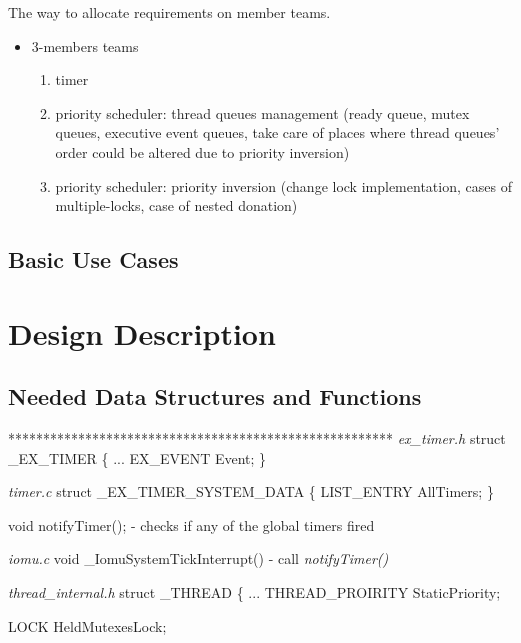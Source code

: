 The way to allocate requirements on member teams. 
\begin{itemize}
    \item 3-members teams
        \begin{enumerate}
            \item timer
            
            \item priority scheduler: thread queues management (ready queue, mutex queues, executive event queues, take care of places where thread queues' order could be altered due to priority inversion)
            
            \item priority scheduler: priority inversion (change lock implementation, cases of multiple-locks, case of nested donation)
            
        \end{enumerate}

\end{itemize}



\subsection{Basic Use Cases}



\section{Design Description}

\subsection{Needed Data Structures and Functions}

*******************************************************
\textit{ex_timer.h}
struct _EX_TIMER \{
	...
	EX_EVENT Event;
\}

\textit{timer.c}
struct _EX_TIMER_SYSTEM_DATA \{
	LIST_ENTRY AllTimers;
\}

void notifyTimer();
	- checks if any of the global timers fired

\textit{iomu.c}
void _IomuSystemTickInterrupt()
	- call \textit{notifyTimer()}

\textit{thread_internal.h}
struct _THREAD \{
	...
	THREAD_PROIRITY StaticPriority;

	LOCK HeldMutexesLock;

